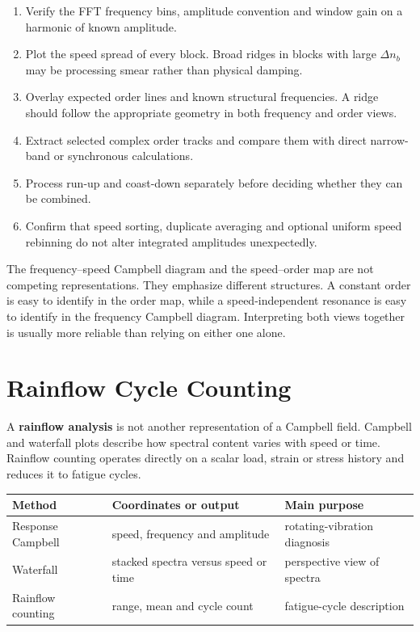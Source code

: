 \begin{enumerate}
    \item Verify the FFT frequency bins, amplitude convention and window gain on
        a harmonic of known amplitude.

    \item Plot the speed spread of every block. Broad ridges in blocks with large
        $ \Delta n_b $ may be processing smear rather than physical damping.

    \item Overlay expected order lines and known structural frequencies. A ridge
        should follow the appropriate geometry in both frequency and order views.

    \item Extract selected complex order tracks and compare them with direct
        narrow-band or synchronous calculations.

    \item Process run-up and coast-down separately before deciding whether they
        can be combined.

    \item Confirm that speed sorting, duplicate averaging and optional uniform
        speed rebinning do not alter integrated amplitudes unexpectedly.
\end{enumerate}

The frequency--speed Campbell diagram and the speed--order map are not competing
representations. They emphasize different structures. A constant order is easy
to identify in the order map, while a speed-independent resonance is easy to
identify in the frequency Campbell diagram. Interpreting both views together is
usually more reliable than relying on either one alone.



\section{Rainflow Cycle Counting}

A \textbf{rainflow analysis} is not another representation of a Campbell
field. Campbell and waterfall plots describe how spectral content varies with
speed or time. Rainflow counting operates directly on a scalar load, strain or
stress history and reduces it to fatigue cycles.

\begin{center}
\begin{tabular}{@{}p{}p{}p{}@{}}
\textbf{Method} & \textbf{Coordinates or output} & \textbf{Main purpose} \\
\hline
Response Campbell & speed, frequency and amplitude & rotating-vibration diagnosis \\
Waterfall & stacked spectra versus speed or time & perspective view of spectra \\
Rainflow counting & range, mean and cycle count & fatigue-cycle description
\end{tabular}
\end{center}

